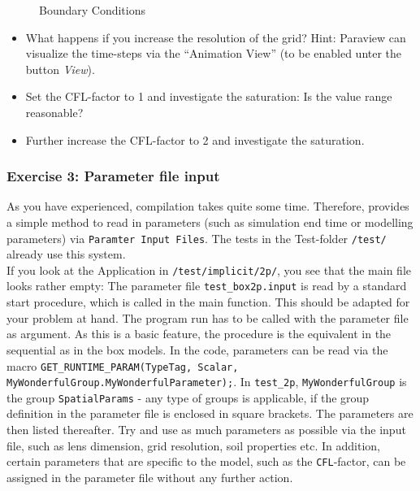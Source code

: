 \begin{figure}[ht]
\centering
{}
\caption{Boundary Conditions}\label{tutorial-sequential:ex2_BC}
\end{figure}

\begin{itemize}
 \item What happens if you increase the resolution of the grid? Hint: Paraview
 can visualize the time-steps via the ``Animation View'' (to be enabled unter the button \textit{View}).
 \item Set the CFL-factor to 1 and investigate the saturation: Is the value range reasonable?
 \item Further increase the CFL-factor to 2 and investigate the saturation.
\end{itemize}

\subsubsection{Exercise 3: Parameter file input}
As you have experienced, compilation takes quite some time. Therefore, \Dumux
provides a simple method to read in parameters (such as simulation end time or
modelling parameters) via \texttt{Paramter Input Files}. The tests in the Test-folder
\texttt{/test/} already use this system.\\
If you look at the Application in \texttt{/test/implicit/2p/}, you see that
the main file looks rather empty: The parameter file \texttt{test\_box2p.input}
is read by a standard start procedure, which is called in the main function.
This should be adapted for your problem at hand. The program run has to be
called with the parameter file as argument. As this is a basic \Dumux feature,
the procedure is the equivalent in the sequential as in the box models.
In the code, parameters can be read via the macro
\texttt{GET\_RUNTIME\_PARAM(TypeTag, Scalar, MyWonderfulGroup.MyWonderfulParameter);}.
In \texttt{test\_2p}, \texttt{MyWonderfulGroup} is the group \texttt{SpatialParams}
- any type of groups is applicable, if the group definition in the parameter file
is enclosed in square brackets. The parameters are then listed thereafter.
Try and use as much parameters as possible via the input file, such as lens
dimension, grid resolution, soil properties etc. In addition, certain parameters
that are specific to the model, such as the \texttt{CFL}-factor, can be assigned
in the parameter file without any further action.

